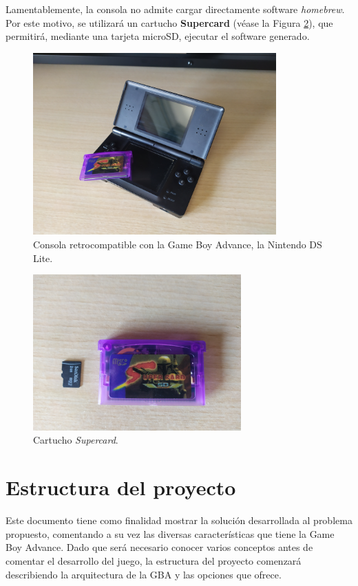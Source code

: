 Lamentablemente, la consola no admite cargar directamente software \textit{homebrew}. Por este motivo, se utilizará un cartucho \textbf{Supercard} (véase la Figura \ref{fig:supercard}), que permitirá, mediante una tarjeta microSD, ejecutar el software generado.

\begin{figure}[h]
	\centering
	\includegraphics[height=7cm]{capitulos/capitulo1/nintendo_ds.jpg}
	\caption{Consola retrocompatible con la Game Boy Advance, la Nintendo DS Lite.}
	\label{fig:nintendo_ds}
\end{figure}

\vspace{1cm}

\begin{figure}[h]
	\centering
	\includegraphics[height=6cm]{capitulos/capitulo1/supercard.jpg}
	\caption{Cartucho \textit{Supercard}.}
	\label{fig:supercard}
\end{figure}
\FloatBarrier

\section{Estructura del proyecto}
Este documento tiene como finalidad mostrar la solución desarrollada al problema propuesto, comentando a su vez las diversas características que tiene la Game Boy Advance. Dado que será necesario conocer varios conceptos antes de comentar el desarrollo del juego, la estructura del proyecto comenzará describiendo la arquitectura de la GBA y las opciones que ofrece.

